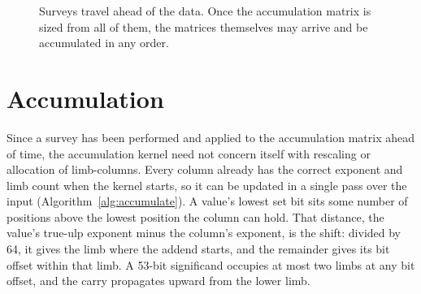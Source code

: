 \documentclass[acmsmall,screen,review]{acmart}
\begin{document}
\begin{figure}[t]
\centering
{}
\caption{Surveys travel ahead of the data. Once the accumulation matrix is sized from all of them, the matrices themselves may arrive and be accumulated in any order.}
\label{fig:datacenter}
\end{figure}

\section{Accumulation}

Since a survey has been performed and applied to the accumulation matrix ahead of time, the accumulation kernel need not concern itself with rescaling or allocation of limb-columns. Every column already has the correct exponent and limb count when the kernel starts, so it can be updated in a single pass over the input (Algorithm~\ref{alg:accumulate}). A value's lowest set bit sits some number of positions above the lowest position the column can hold. That distance, the value's true-ulp exponent minus the column's exponent, is the shift: divided by 64, it gives the limb where the addend starts, and the remainder gives its bit offset within that limb. A 53-bit significand occupies at most two limbs at any bit offset, and the carry propagates upward from the lower limb.
\end{document}
